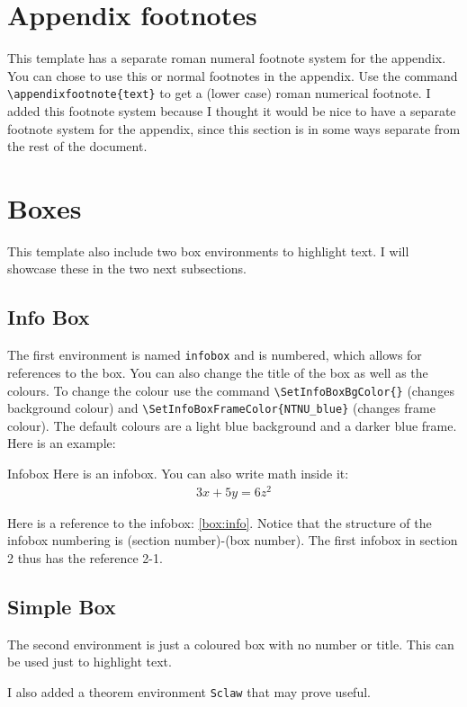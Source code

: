 \section{Appendix footnotes}
This template has a separate roman numeral footnote system for the appendix. You can chose to use this or normal footnotes in the appendix. Use the command \verb+\appendixfootnote{text}+ to get a (lower case) roman numerical footnote. I added this footnote system because I thought it would be nice to have a separate footnote system for the appendix, since this section is in some ways separate from the rest of the document.

\section{Boxes}
This template also include two box environments to highlight text. I will showcase these in the two next subsections.

\subsection{Info Box}
The first environment is named \verb+infobox+ and is numbered, which allows for references to the box. You can also change the title of the box as well as the colours. To change the colour use the command \verb+\SetInfoBoxBgColor{}+ (changes background colour) and \verb#\SetInfoBoxFrameColor{NTNU_blue}# (changes frame colour). The default colours are a light blue background and a darker blue frame. Here is an example:

\begin{infobox}[label=box:info]{Infobox}
Here is an infobox. You can also write math inside it:
\begin{align*}
    3x+5y=6z^2
\end{align*}

\end{infobox}

Here is a reference to the infobox: \cref{box:info}. Notice that the structure of the infobox numbering is (section number)-(box number). The first infobox in section 2 thus has the reference 2-1.

\subsection{Simple Box}
The second environment is just a coloured box with no number or title. This can be used just to highlight text. \par
I also added a theorem environment \verb?Sclaw? that may prove useful. 

